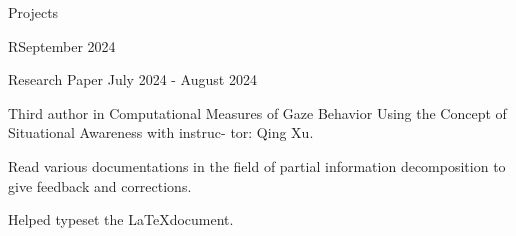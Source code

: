 \documentclass[
	11pt, %
]{resume} %
\begin{document}
\begin{rSection}{Projects}
\begin{rSubsection}{R}{September 2024}{}{}
	\end{rSubsection}
	

	\begin{rSubsection}{Research Paper }{July 2024 - August 2024}{}{}
		\item Third author in Computational Measures of Gaze Behavior Using the Concept of Situational Awareness with instruc-
		tor: Qing Xu.
		\item Read various documentations in the field of partial information decomposition to give feedback and corrections.
		\item Helped typeset the \LaTeX document.
	\end{rSubsection}
	


	

\end{rSection}



		
	
		
\end{document}
